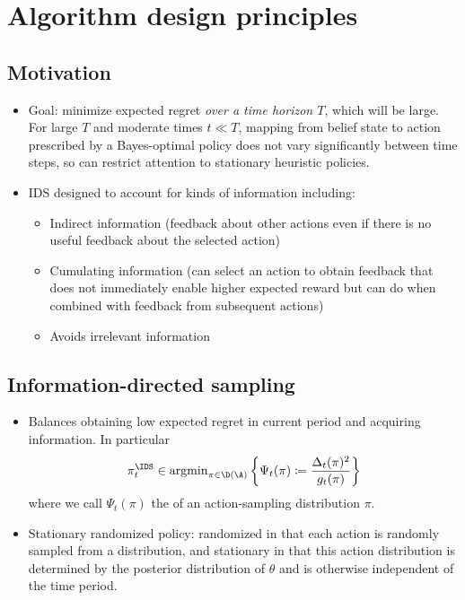 \documentclass[11pt, openany]{book}
\begin{document}
\section{Algorithm design principles}
\subsection{Motivation}
\begin{itemize}
    \item Goal: minimize expected regret \emph{over a time horizon $T$}, which will be large. For large $T$ and moderate times $t\ll T$, mapping from belief state to action prescribed by a Bayes-optimal policy does not vary significantly between time steps, so can restrict attention to stationary heuristic policies.
    \item IDS designed to account for kinds of information including:
        \begin{itemize}
            \item Indirect information (feedback about other actions even if there is no useful feedback about the selected action)
            \item Cumulating information (can select an action to obtain feedback that does not immediately enable higher expected reward but can do when combined with feedback from subsequent actions)
            \item Avoids irrelevant information
        \end{itemize}
\end{itemize}

\subsection{Information-directed sampling}
\begin{itemize}
    \item Balances obtaining low expected regret in current period and acquiring information. In particular
        \[
            \pi_t^{\IDS} \in \argmin_{\pi\in\D(\A)} \set{ \Psi_t(\pi) \defeq \frac{\Delta_t(\pi)^2}{g_t(\pi)} }
        \]
        where we call $\Psi_t(\pi)$ the  of an action-sampling distribution $\pi$.
    \item Stationary randomized policy: randomized in that each action is randomly sampled from a distribution, and stationary in that this action distribution is determined by the posterior distribution of $\theta$ and is otherwise independent of the time period.
\end{itemize}
\end{document}

